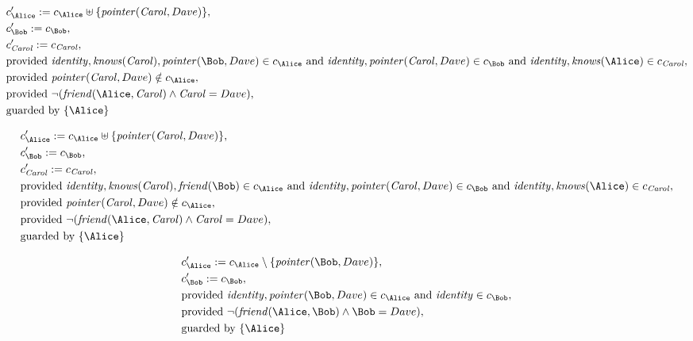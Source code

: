 \begin{align*}
&
c'_
{
\Alice
}
 := 
c_
{
\Alice
}
 \uplus 
\{
\mathit{
pointer
}
(
\mathit{Carol}
,
Dave
)
\}
,\\
&
c'_
{
\Bob
}
 := 
c_
{
\Bob
}
,\\
&
c'_
{
\mathit{Carol}
}
 := 
c_
{
\mathit{Carol}
}
,\\
&
\text{provided } 
\mathit{
identity
}
,
\mathit{
knows
}
(
\mathit{Carol}
)
,
\mathit{
pointer
}
(
\Bob
,
Dave
)
 \in c_
{
\Alice
}
 \text{ and } 
\mathit{
identity
}
,
\mathit{
pointer
}
(
\mathit{Carol}
,
Dave
)
 \in c_
{
\Bob
}
 \text{ and } 
\mathit{
identity
}
,
\mathit{
knows
}
(
\Alice
)
 \in c_
{
\mathit{Carol}
}
,\\
&
\text{provided } 
\mathit{
pointer
}
(
\mathit{Carol}
,
Dave
)
 \notin c_
{
\Alice
}
,\\
&
\text{provided } 
\neg 
(
\mathit{
friend
}
(
\Alice
,
\mathit{Carol}
)
\land
\mathit{Carol}
=
Dave
)
,\\
&
\text{guarded by } \{
\Alice
\}
\end{align*}

\begin{align*}
&
c'_
{
\Alice
}
 := 
c_
{
\Alice
}
 \uplus 
\{
\mathit{
pointer
}
(
\mathit{Carol}
,
Dave
)
\}
,\\
&
c'_
{
\Bob
}
 := 
c_
{
\Bob
}
,\\
&
c'_
{
\mathit{Carol}
}
 := 
c_
{
\mathit{Carol}
}
,\\
&
\text{provided } 
\mathit{
identity
}
,
\mathit{
knows
}
(
\mathit{Carol}
)
,
\mathit{
friend
}
(
\Bob
)
 \in c_
{
\Alice
}
 \text{ and } 
\mathit{
identity
}
,
\mathit{
pointer
}
(
\mathit{Carol}
,
Dave
)
 \in c_
{
\Bob
}
 \text{ and } 
\mathit{
identity
}
,
\mathit{
knows
}
(
\Alice
)
 \in c_
{
\mathit{Carol}
}
,\\
&
\text{provided } 
\mathit{
pointer
}
(
\mathit{Carol}
,
Dave
)
 \notin c_
{
\Alice
}
,\\
&
\text{provided } 
\neg 
(
\mathit{
friend
}
(
\Alice
,
\mathit{Carol}
)
\land
\mathit{Carol}
=
Dave
)
,\\
&
\text{guarded by } \{
\Alice
\}
\end{align*}

\begin{align*}
&
c'_
{
\Alice
}
 := 
c_
{
\Alice
}
 \setminus 
\{
\mathit{
pointer
}
(
\Bob
,
Dave
)
\}
,\\
&
c'_
{
\Bob
}
 := 
c_
{
\Bob
}
,\\
&
\text{provided } 
\mathit{
identity
}
,
\mathit{
pointer
}
(
\Bob
,
Dave
)
 \in c_
{
\Alice
}
 \text{ and } 
\mathit{
identity
}
 \in c_
{
\Bob
}
,\\
&
\text{provided } 
\neg 
(
\mathit{
friend
}
(
\Alice
,
\Bob
)
\land
\Bob
=
Dave
)
,\\
&
\text{guarded by } \{
\Alice
\}
\end{align*}
